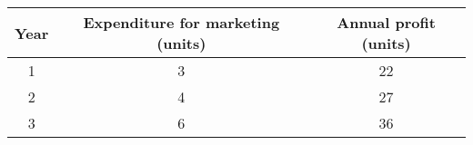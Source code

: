 \begin{center}
\begin{tabular}{|c|c|c|}
\hline
Year & Expenditure for marketing (units) & Annual profit (units) \\
\hline
1 & 3 & 22 \\
\hline
2 & 4 & 27 \\
\hline
3 & 6 & 36 \\
\hline
\end{tabular}
\end{center}
